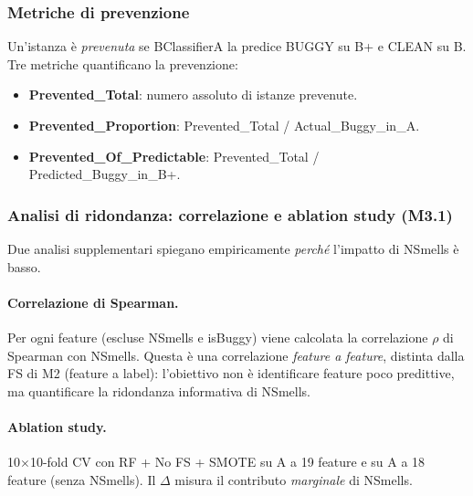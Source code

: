 \subsubsection{Metriche di prevenzione}

Un'istanza è \textit{prevenuta} se BClassifierA la predice BUGGY su B+ e CLEAN su B.
Tre metriche quantificano la prevenzione:
\begin{itemize}[noitemsep]
  \item \textbf{Prevented\_Total}: numero assoluto di istanze prevenute.
  \item \textbf{Prevented\_Proportion}: Prevented\_Total / Actual\_Buggy\_in\_A.
  \item \textbf{Prevented\_Of\_Predictable}: Prevented\_Total / Predicted\_Buggy\_in\_B+.
\end{itemize}

\subsubsection{Analisi di ridondanza: correlazione e ablation study (M3.1)}

Due analisi supplementari spiegano empiricamente \textit{perché} l'impatto di NSmells
è basso.

\paragraph{Correlazione di Spearman.}
Per ogni feature (escluse NSmells e isBuggy) viene calcolata la correlazione $\rho$ di
Spearman con NSmells. Questa è una correlazione
\textit{feature a feature}, distinta dalla FS di M2 (feature a label): l'obiettivo non è
identificare feature poco predittive, ma quantificare la ridondanza informativa di NSmells.

\paragraph{Ablation study.}
10$\times$10-fold CV con RF + No FS + SMOTE su A a 19 feature e su A a 18 feature (senza
NSmells). Il $\Delta$ misura il contributo \textit{marginale} di NSmells.
